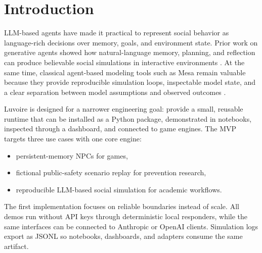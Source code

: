 \section{Introduction}

LLM-based agents have made it practical to represent social behavior as language-rich decisions over memory, goals, and environment state. Prior work on generative agents showed how natural-language memory, planning, and reflection can produce believable social simulations in interactive environments \cite{park2023generative}. At the same time, classical agent-based modeling tools such as Mesa remain valuable because they provide reproducible simulation loops, inspectable model state, and a clear separation between model assumptions and observed outcomes \cite{terhoeven2025mesa}.

Luvoire is designed for a narrower engineering goal: provide a small, reusable runtime that can be installed as a Python package, demonstrated in notebooks, inspected through a dashboard, and connected to game engines. The MVP targets three use cases with one core engine:

\begin{itemize}
  \item persistent-memory NPCs for games,
  \item fictional public-safety scenario replay for prevention research,
  \item reproducible LLM-based social simulation for academic workflows.
\end{itemize}

The first implementation focuses on reliable boundaries instead of scale. All demos run without API keys through deterministic local responders, while the same interfaces can be connected to Anthropic or OpenAI clients. Simulation logs export as JSONL so notebooks, dashboards, and adapters consume the same artifact.
